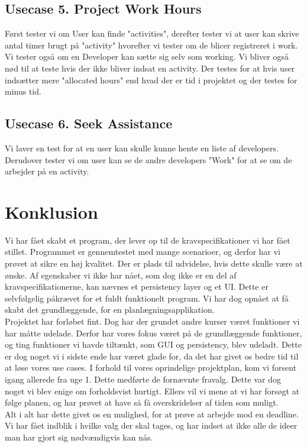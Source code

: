 \documentclass[a4paper,12pt]{article}
\begin{document}
\subsection*{Usecase 5. Project Work Hours}
Først tester vi om User kan finde "activities", derefter tester vi at user kan skrive antal timer brugt på "activity" hvorefter vi tester om de blicer registreret i work. Vi tester også om en Developer kan sætte sig selv som working. Vi bliver også nød til at teste hvis der ikke bliver indsat en activity. Der testes for at hvis user indsætter mere "allocated hours" end hvad der er tid i projektet og der testes for minus tid.

\subsection*{Usecase 6. Seek Assistance}
Vi laver en test for at en user kan skulle kunne hente en liste af developers. Derudover tester vi om user kan se de andre developers "Work" for at se om de arbejder på en activity.

\section{Konklusion}
Vi har fået skabt et program, der lever op til de kravspecifikationer vi har fået stillet. Programmet er gennemtestet med mange scenarioer, og derfor har vi prøvet at sikre en høj kvalitet. Der er plads til udvidelse, hvis dette skulle være at ønske. Af egenskaber vi ikke har nået, som dog ikke er en del af kravspecifikationerne, kan nævnes et persistency layer og et UI. Dette er selvfølgelig påkrævet for et fuldt funktionelt program. Vi har dog opnået at få skabt det grundlæggende, for en planlægningsapplikation.\\ 
Projektet har forløbet fint. Dog har der grundet andre kurser været funktioner vi har måtte udelade. Derfor har vores fokus været på de grundlæggende funktioner, og ting funktioner vi havde tiltænkt, som GUI og persistency, blev udeladt. Dette er dog noget vi i sidste ende har været glade for, da det har givet os bedre tid til at løse vores use cases. I forhold til vores oprindelige projektplan, kom vi forsent igang allerede fra uge 1. Dette medførte de fornævnte fravalg. Dette var dog noget vi blev enige om forholdsvist hurtigt. Ellers vil vi mene at vi har forsøgt at følge planen, og har prøvet at have så få overskridelser af tiden som muligt.\\
Alt i alt har dette givet os en mulighed, for at prøve at arbejde mod en deadline. Vi har fået indblik i hvilke valg der skal tages, og har indset at ikke alle de ideer man har gjort sig nødvændigvis kan nås.
\newpage
\end{document}
